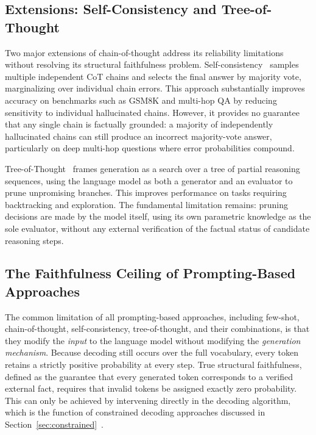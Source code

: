 \subsection{Extensions: Self-Consistency and Tree-of-Thought}

Two major extensions of chain-of-thought address its reliability limitations without resolving its structural faithfulness problem. Self-consistency~\citep{wang2023selfconsistency} samples multiple independent CoT chains and selects the final answer by majority vote, marginalizing over individual chain errors. This approach substantially improves accuracy on benchmarks such as GSM8K and multi-hop QA by reducing sensitivity to individual hallucinated chains. However, it provides no guarantee that any single chain is factually grounded: a majority of independently hallucinated chains can still produce an incorrect majority-vote answer, particularly on deep multi-hop questions where error probabilities compound.

Tree-of-Thought~\citep{yao2023tree} frames generation as a search over a tree of partial reasoning sequences, using the language model as both a generator and an evaluator to prune unpromising branches. This improves performance on tasks requiring backtracking and exploration. The fundamental limitation remains: pruning decisions are made by the model itself, using its own parametric knowledge as the sole evaluator, without any external verification of the factual status of candidate reasoning steps.

\subsection{The Faithfulness Ceiling of Prompting-Based Approaches}

The common limitation of all prompting-based approaches, including few-shot, chain-of-thought, self-consistency, tree-of-thought, and their combinations, is that they modify the \textit{input} to the language model without modifying the \textit{generation mechanism}. Because decoding still occurs over the full vocabulary, every token retains a strictly positive probability at every step. True structural faithfulness, defined as the guarantee that every generated token corresponds to a verified external fact, requires that invalid tokens be assigned exactly zero probability. This can only be achieved by intervening directly in the decoding algorithm, which is the function of constrained decoding approaches discussed in Section~\ref{sec:constrained}~\citep{geng2023gcd, willard2023outlines}.

